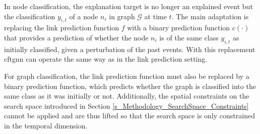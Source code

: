 In node classification, the explanation target is no longer an explained event but the classification $y_{i, t}$ of a node $n_i$ in graph $\mathcal{G}$ at time $t$. The main adaptation is replacing the link prediction function $f$ with a binary prediction function $c(\cdot)$ that provides a prediction of whether the node $n_i$ is of the same class $y_{i, t}$ as initially classified, given a perturbation of the past events. With this replacement \gls{cftgnn} can operate the same way as in the link prediction setting.

For graph classification, the link prediction function must also be replaced by a binary prediction function, which predicts whether the graph is classified into the same class as it was initially or not. Additionally, the spatial constraints on the search space introduced in Section \ref{s_Methodology_SearchSpace_Constraints} cannot be applied and are thus lifted so that the search space is only constrained in the temporal dimension.

\fi